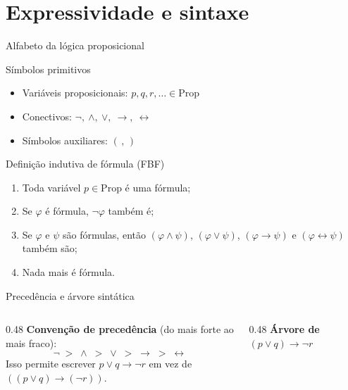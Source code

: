 \documentclass[10pt,aspectratio=169]{beamer}
\begin{document}
\section{Expressividade e sintaxe}
\begin{frame}{Alfabeto da lógica proposicional}
  \begin{block}{Símbolos primitivos}
    \begin{itemize}
      \item Variáveis proposicionais: $p, q, r, \dots \in \mathrm{Prop}$
      \item Conectivos: $\neg,\ \land,\ \lor,\ \rightarrow,\ \leftrightarrow$
      \item Símbolos auxiliares: $(\,,\,)$
    \end{itemize}
  \end{block}
  \begin{alertblock}{Definição indutiva de fórmula (FBF)}
    \begin{enumerate}
      \item Toda variável $p\in\mathrm{Prop}$ é uma fórmula;
      \item Se $\varphi$ é fórmula, $\neg\varphi$ também é;
      \item Se $\varphi$ e $\psi$ são fórmulas, então $(\varphi\land\psi)$, $(\varphi\lor\psi)$, $(\varphi\rightarrow\psi)$ e $(\varphi\leftrightarrow\psi)$ também são;
      \item Nada mais é fórmula.
    \end{enumerate}
  \end{alertblock}
\end{frame}

\begin{frame}{Precedência e árvore sintática}
  \begin{columns}[T]
    \begin{column}{0.48\textwidth}
      \textbf{Convenção de precedência} (do mais forte ao mais fraco):
      \[ \neg \;>\; \land \;>\; \lor \;>\; \rightarrow \;>\; \leftrightarrow \]
      Isso permite escrever $p\lor q \rightarrow \neg r$ em vez de\\
      $((p\lor q)\rightarrow(\neg r))$.
    \end{column}
    \begin{column}{0.48\textwidth}
      \centering
      \textbf{Árvore de } $(p\lor q)\rightarrow \neg r$\par\medskip
    \end{column}
  \end{columns}
\end{frame}
\end{document}
